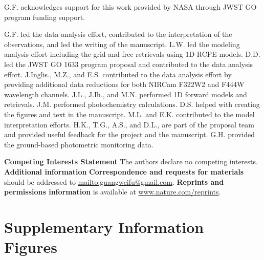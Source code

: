 \documentclass[sn-standardnature]{sn-jnl}%
\begin{document}



G.F. acknowledges support for this work provided by NASA through JWST GO program funding support. 

G.F. led the data analysis effort, contributed to the interpretation of the observations, and led the writing of the manuscript. L.W. led the modeling analysis effort including the grid and free retrievals using 1D-RCPE models. D.D. led the JWST GO 1633 program proposal and contributed to the data analysis effort. J.Inglis., M.Z., and E.S. contributed to the data analysis effort by providing additional data reductions for both NIRCam F322W2 and F444W wavelength channels. J.L., J.Ih., and M.N. performed 1D forward models and retrievals. J.M. performed photochemistry calculations. D.S. helped with creating the figures and text in the manuscript. M.L. and E.K. contributed to the model interpretation efforts. H.K., T.G., A.S., and D.L., are part of the proposal team and provided useful feedback for the project and the manuscript. G.H. provided the ground-based photometric monitoring data.

\noindent \textbf{Competing Interests Statement} The authors declare no competing interests.\\

\noindent\textbf{Additional information}\newline
\textbf{Correspondence and requests for materials} should be addressed to \href{Guangwei Fu}{mailto:guangweifu@gmail.com}.
\newline
\textbf{Reprints and permissions information} is available at \url{www.nature.com/reprints}.


\section*{Supplementary Information Figures}
\end{document}
